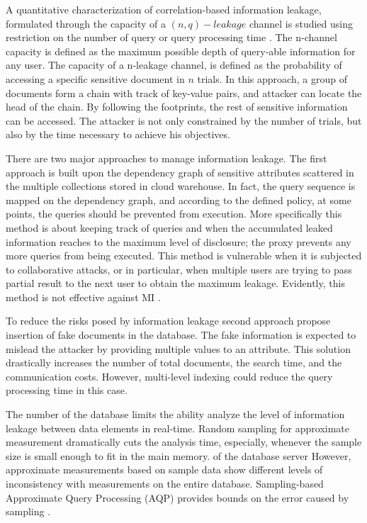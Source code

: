 A quantitative characterization of correlation-based information leakage, formulated through the capacity of a $(n,q)-leakage$ channel is studied using restriction on the number of query or query processing time \cite{4221659}. The n-channel capacity is defined as the maximum possible depth of query-able information for any user. The capacity of a n-leakage channel, is defined as the probability of accessing a specific sensitive document in $n$ trials. In this approach, a group of documents form a chain with track of key-value pairs, and attacker can locate the head of the chain. By following the footprints, the rest of sensitive information can be accessed. The attacker is not only constrained by the number of trials, but also by the time necessary to achieve his objectives.

There are two major approaches to manage information leakage. The first approach is built upon the dependency graph of sensitive attributes scattered in the multiple collections stored in cloud warehouse. In fact, the query sequence is mapped on the dependency graph, and according to the defined policy, at some points, the queries should be prevented from execution. More specifically this method is about keeping track of queries and when the accumulated leaked information reaches to the maximum level of disclosure; the proxy prevents any more queries from being executed. This method is vulnerable when it is subjected to collaborative attacks, or in particular, when multiple users are trying to pass partial result to the next user to obtain the maximum leakage. Evidently, this method is not effective against MI \cite{4221659}.

To reduce the risks posed by information leakage second approach propose insertion of fake documents in the database.  The fake information is expected to mislead the attacker by providing multiple values to an attribute. This solution drastically increases the number of total documents, the search time, and the communication costs\cite{whang2010managing}. However, multi-level indexing could reduce the query processing time in this case.

The number of the database limits the  ability analyze the level of information leakage between data elements in real-time. Random sampling for approximate measurement dramatically cuts the analysis time, especially, whenever the sample size is small enough to fit in the main memory. of the database server However, approximate measurements based on sample data show different levels of inconsistency with measurements on the entire database. Sampling-based Approximate Query Processing (AQP) provides bounds on the error caused by sampling \cite{agarwal2014knowing, chatzikokolakis2009calculating}.

